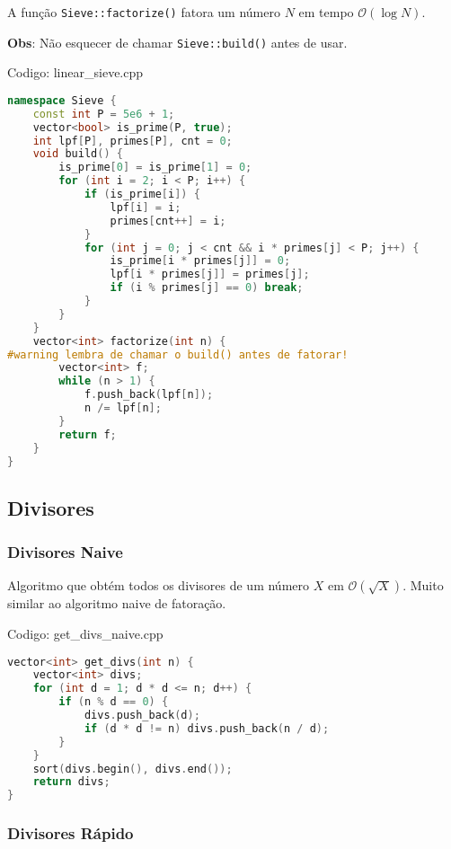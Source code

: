 \documentclass[10pt, a4paper, oneside]{book}
\begin{document}
A função \texttt{Sieve::factorize()} fatora um número $N$ em tempo $\mathcal{O}(\log N)$.



\textbf{Obs}: Não esquecer de chamar \texttt{Sieve::build()} antes de usar.
\hfill

Codigo: linear\_sieve.cpp

\begin{lstlisting}[language=C++]
namespace Sieve {
    const int P = 5e6 + 1;
    vector<bool> is_prime(P, true);
    int lpf[P], primes[P], cnt = 0;
    void build() {
        is_prime[0] = is_prime[1] = 0;
        for (int i = 2; i < P; i++) {
            if (is_prime[i]) {
                lpf[i] = i;
                primes[cnt++] = i;
            }
            for (int j = 0; j < cnt && i * primes[j] < P; j++) {
                is_prime[i * primes[j]] = 0;
                lpf[i * primes[j]] = primes[j];
                if (i % primes[j] == 0) break;
            }
        }
    }
    vector<int> factorize(int n) {
#warning lembra de chamar o build() antes de fatorar!
        vector<int> f;
        while (n > 1) {
            f.push_back(lpf[n]);
            n /= lpf[n];
        }
        return f;
    }
}
\end{lstlisting}
\hfill

\subsection{Divisores}
\subsubsection{Divisores Naive}


Algoritmo que obtém todos os divisores de um número $X$ em $\mathcal{O}(\sqrt{X})$. Muito similar ao algoritmo naive de fatoração.
\hfill

Codigo: get\_divs\_naive.cpp

\begin{lstlisting}[language=C++]
vector<int> get_divs(int n) {
    vector<int> divs;
    for (int d = 1; d * d <= n; d++) {
        if (n % d == 0) {
            divs.push_back(d);
            if (d * d != n) divs.push_back(n / d);
        }
    }
    sort(divs.begin(), divs.end());
    return divs;
}
\end{lstlisting}
\hfill

\subsubsection{Divisores Rápido}
\end{document}
